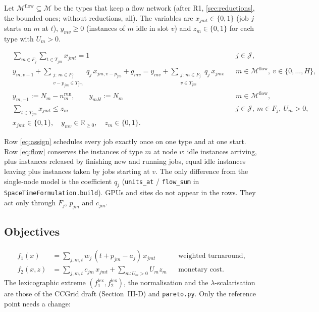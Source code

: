\documentclass[11pt,a4paper]{article}
\newcommand{\J}{\mathcal{J}}
\newcommand{\M}{\mathcal{M}}
\newcommand{\R}{\mathbb{R}}
\newcommand{\code}[1]{\texttt{#1}}
\newcommand{\run}{\mathrm{run}}
\begin{document}
Let $\M^{\mathrm{flow}}\subseteq\M$ be the types that keep a flow network
(after R1, \cref{sec:reductions}, the bounded ones; without reductions, all).
The variables are $x_{jmt}\in\{0,1\}$ (job $j$ starts on $m$ at $t$),
$y_{mv}\ge0$ (instances of $m$ idle in slot $v$) and $z_m\in\{0,1\}$ for each
type with $U_m>0$.

\begin{align}
  &\sum_{m\in F_j}\sum_{t\in T_{jm}}x_{jmt}=1
    && j\in\J, \label{eq:assign}\\[2pt]
  &y_{m,v-1}+\!\!\sum_{\substack{j:\,m\in F_j\\ v-p_{jm}\in T_{jm}}}\!\! q_j\,x_{jm,v-p_{jm}}+g_{mv}
   = y_{mv}+\!\!\sum_{\substack{j:\,m\in F_j\\ v\in T_{jm}}}\!\! q_j\,x_{jmv}
    && m\in\M^{\mathrm{flow}},\ v\in\{0,\dots,H\}, \label{eq:flow}\\[2pt]
  &\textstyle y_{m,-1}:=N_m-n^\run_m,\qquad y_{mH}:=N_m
    && m\in\M^{\mathrm{flow}}, \label{eq:boundary}\\[2pt]
  &\sum_{t\in T_{jm}}x_{jmt}\le z_m
    && j\in\J,\ m\in F_j,\ U_m>0, \label{eq:fixed}\\[2pt]
  &x_{jmt}\in\{0,1\},\quad y_{mv}\in\R_{\ge0},\quad z_m\in\{0,1\}. \label{eq:domains}
\end{align}

Row \eqref{eq:assign} schedules every job exactly once on one type and at one
start. Row \eqref{eq:flow} conserves the instances of type $m$ at node $v$:
idle instances arriving, plus instances released by finishing new and running
jobs, equal idle instances leaving plus instances taken by jobs starting at $v$.
The only difference from the single-node model is the coefficient $q_j$
(\code{units\_at} / \code{flow\_sum} in \code{SpaceTimeFormulation.build}).
GPUs and sites do not appear in the rows. They act only through $F_j$, $p_{jm}$
and $c_{jm}$.

\subsection{Objectives}

\begin{align}
  f_1(x)&=\sum_{j,m,t}w_j\,(t+p_{jm}-a_j)\,x_{jmt}
    &&\text{weighted turnaround,}\label{eq:f1}\\
  f_2(x,z)&=\sum_{j,m,t}c_{jm}\,x_{jmt}+\sum_{m:U_m>0}U_m z_m
    &&\text{monetary cost.}\label{eq:f2}
\end{align}
The lexicographic extreme $(f_1^{\mathrm{lex}},f_2^{\mathrm{lex}})$, the
normalisation and the $\lambda$-scalarisation are those of the CCGrid draft
(Section~III-D) and \code{pareto.py}. Only the reference point needs a change:
\end{document}
